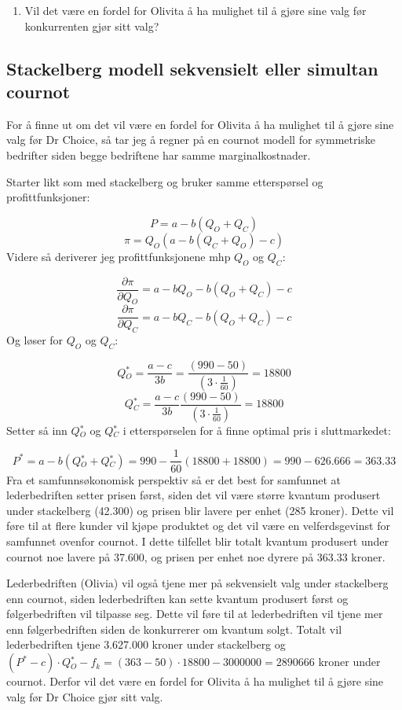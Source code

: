 \documentclass[
  12pt,
  a4paper,
  DIV=11,
  numbers=noendperiod]{scrartcl}
\providecommand{\tightlist}{%
  \setlength{\itemsep}{0pt}\setlength{\parskip}{0pt}}\usepackage{longtable,booktabs,array}
\begin{document}
\clearpage

\begin{enumerate}
\def\labelenumi{\alph{enumi})}
\setcounter{enumi}{1}
\tightlist
\item
  Vil det være en fordel for Olivita å ha mulighet til å gjøre sine valg
  før konkurrenten gjør sitt valg?
\end{enumerate}

\subsection{Stackelberg modell sekvensielt eller simultan
cournot}\label{stackelberg-modell-sekvensielt-eller-simultan-cournot}

For å finne ut om det vil være en fordel for Olivita å ha mulighet til å
gjøre sine valg før Dr Choice, så tar jeg å regner på en cournot modell
for symmetriske bedrifter siden begge bedriftene har samme
marginalkostnader.

Starter likt som med stackelberg og bruker samme etterspørsel og
profittfunksjoner:

\[P = a - b(Q_O+Q_C) \tag{10}\] \[\pi = Q_O(a-b(Q_C+Q_O)-c) \tag{11}\]
Videre så deriverer jeg profittfunksjonene mhp \(Q_O\) og \(Q_C\):

\[\frac{\partial \pi}{\partial Q_O} = a -b Q_O - b(Q_O+Q_C) -c \tag{12}\]
\[\frac{\partial \pi}{\partial Q_C} = a -b Q_C - b(Q_O+Q_C) -c \tag{13}\]
Og løser for \(Q_O\) og \(Q_C\):

\[Q{_O^*} = \frac{a-c}{3b} = \frac{(990-50)}{(3 \cdot \frac{1}{60})} = 18800 \tag{14}\]
\[Q{_C^*} = \frac{a-c}{3b} \frac{(990-50)}{(3 \cdot \frac{1}{60})} = 18800 \tag{15}\]
Setter så inn \(Q{_O^*}\) og \(Q{_C^*}\) i etterspørselen for å finne
optimal pris i sluttmarkedet:

\[P^* = a - b(Q{_O^*}+Q{_C^*}) = 990 - \frac{1}{60}(18800+18800) = 990 - 626.666 = 363.33 \tag{16}\]
Fra et samfunnsøkonomisk perspektiv så er det best for samfunnet at
lederbedriften setter prisen først, siden det vil være større kvantum
produsert under stackelberg (42.300) og prisen blir lavere per enhet
(285 kroner). Dette vil føre til at flere kunder vil kjøpe produktet og
det vil være en velferdsgevinst for samfunnet ovenfor cournot. I dette
tilfellet blir totalt kvantum produsert under cournot noe lavere på
37.600, og prisen per enhet noe dyrere på 363.33 kroner.

Lederbedriften (Olivia) vil også tjene mer på sekvensielt valg under
stackelberg enn cournot, siden lederbedriften kan sette kvantum
produsert først og følgerbedriften vil tilpasse seg. Dette vil føre til
at lederbedriften vil tjene mer enn følgerbedriften siden de konkurrerer
om kvantum solgt. Totalt vil lederbedriften tjene 3.627.000 kroner under
stackelberg og
\((P^* -c) \cdot Q{_O^*} -f_k =(363 -50) \cdot18800 - 3000000 = 2890666\)
kroner under cournot. Derfor vil det være en fordel for Olivita å ha
mulighet til å gjøre sine valg før Dr Choice gjør sitt valg.
\end{document}
